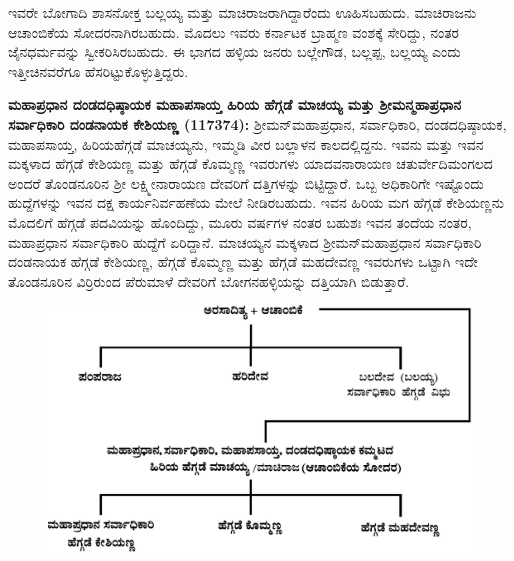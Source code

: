 ಇವರೇ ಬೋಗಾದಿ ಶಾಸನೋಕ್ತ ಬಲ್ಲಯ್ಯ ಮತ್ತು ಮಾಚಿರಾಜರಾಗಿದ್ದಾರೆಂದು ಊಹಿಸಬಹುದು. ಮಾಚಿರಾಜನು ಆಚಾಂಬಿಕೆಯ ಸೋದರನಾಗಿರಬಹುದು. ಮೊದಲು ಇವರು ಕರ್ನಾಟಕ ಬ್ರಾಹ್ಮಣ ವಂಶಕ್ಕೆ ಸೇರಿದ್ದು, ನಂತರ ಜೈನಧರ್ಮವನ್ನು ಸ್ವೀಕರಿಸಿರಬಹುದು. ಈ ಭಾಗದ ಹಳ್ಳಿಯ ಜನರು ಬಲ್ಲೇಗೌಡ, ಬಲ್ಲಪ್ಪ, ಬಲ್ಲಯ್ಯ ಎಂದು ಇತ್ತೀಚಿನವರೆಗೂ ಹೆಸರಿಟ್ಟು\-ಕೊಳ್ಳುತ್ತಿದ್ದರು.

\textbf{ಮಹಾಪ್ರಧಾನ ದಂಡದಧಿಷ್ಠಾಯಕ ಮಹಾಪಸಾಯ್ತ ಹಿರಿಯ ಹೆಗ್ಗಡೆ ಮಾಚಯ್ಯ ಮತ್ತು ಶ‍್ರೀಮನ್ಮಹಾಪ್ರಧಾನ ಸರ್ವಾಧಿಕಾರಿ ದಂಡನಾಯಕ ಕೇಶಿಯಣ್ಣ (1173\general{\enginline{-}}74):} ಶ‍್ರೀಮನ್​ಮಹಾಪ್ರಧಾನ, ಸರ್ವಾಧಿಕಾರಿ, ದಂಡದಧಿಷ್ಠಾಯಕ, ಮಹಾಪಸಾಯ್ತ, ಹಿರಿಯಹೆಗ್ಗಡೆ ಮಾಚಯ್ಯನು, ಇಮ್ಮಡಿ ವೀರ ಬಲ್ಲಾಳನ ಕಾಲದಲ್ಲಿದ್ದನು. ಇವನು ಮತ್ತು ಇವನ ಮಕ್ಕಳಾದ ಹೆಗ್ಗಡೆ ಕೇಶಿಯಣ್ಣ ಮತ್ತು ಹೆಗ್ಗಡೆ ಕೊಮ್ಮಣ್ಣ ಇವರುಗಳು ಯಾದವನಾರಾಯಣ ಚತುರ್ವೇದಿಮಂಗಲದ ಅಂದರೆ ತೊಂಡನೂರಿನ ಶ‍್ರೀ ಲಕ್ಷ್ಮೀನಾರಾಯಣ ದೇವರಿಗೆ ದತ್ತಿಗಳನ್ನು ಬಿಟ್ಟಿದ್ದಾರೆ. ಒಬ್ಬ ಅಧಿಕಾರಿಗೇ ಇಷ್ಟೊಂದು ಹುದ್ದೆಗಳನ್ನು ಇವನ ದಕ್ಷ ಕಾರ್ಯನಿರ್ವಹಣೆಯ ಮೇಲೆ ನೀಡಿರಬಹುದು. ಇವನ ಹಿರಿಯ ಮಗ ಹೆಗ್ಗಡೆ ಕೇಶಿಯಣ್ಣನು ಮೊದಲಿಗೆ ಹೆಗ್ಗಡೆ ಪದವಿಯನ್ನು ಹೊಂದಿದ್ದು, ಮೂರು ವರ್ಷಗಳ ನಂತರ ಬಹುಶಃ ಇವನ ತಂದೆಯ ನಂತರ, ಮಹಾಪ್ರಧಾನ ಸರ್ವಾಧಿಕಾರಿ ಹುದ್ದೆಗೆ ಏರಿದ್ದಾನೆ. ಮಾಚಯ್ಯನ ಮಕ್ಕಳಾದ ಶ‍್ರೀಮನ್​ ಮಹಾಪ್ರಧಾನ ಸರ್ವಾಧಿಕಾರಿ ದಂಡನಾಯಕ ಹೆಗ್ಗಡೆ ಕೇಶಿಯಣ್ಣ, ಹೆಗ್ಗಡೆ ಕೊಮ್ಮಣ್ಣ ಮತ್ತು ಹೆಗ್ಗಡೆ ಮಹದೇವಣ್ಣ ಇವರುಗಳು ಒಟ್ಟಾಗಿ ಇದೇ ತೊಂಡನೂರಿನ ವಿರ್ರಿರುಂದ ಪೆರುಮಾಳೆ ದೇವರಿಗೆ ಬೋಗನಹಳ್ಳಿಯನ್ನು ದತ್ತಿಯಾಗಿ ಬಿಡುತ್ತಾರೆ.

\begin{figure}[H]
\includegraphics[scale=1.25]{images/chap3/chap3fig26.jpeg}
\end{figure}

